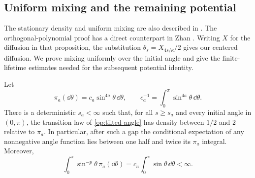 \subsection{Uniform mixing and the remaining potential}

The stationary density and uniform mixing are also described in
\cite[Section~4.2]{LawlerRezaei2015}. The orthogonal-polynomial
proof has a direct counterpart in
Zhan \cite[Proposition~4.2]{Zhan2019Optimal}. Writing $X$ for the
diffusion in that proposition, the substitution $\theta_s=X_{4s/\kappa}/2$
gives our centered diffusion. We prove mixing uniformly over the initial
angle and give the finite-lifetime estimates needed for the subsequent
potential identity.

\begin{lemma}\label{op:mixing}
Let
\begin{equation}
 \pi_a(\dd\theta)=c_a\sin^{4a}\theta\,\dd\theta,
 \qquad c_a^{-1}=\int_0^\pi\sin^{4a}\theta\,\dd\theta.
 \label{op:stationary}
\end{equation}
There is a deterministic $s_a<\infty$ such that, for all $s\ge s_a$
and every initial angle in $(0,\pi)$, the transition law of
\eqref{op:tilted-angle} has density between $1/2$ and $2$ relative to
$\pi_a$. In particular, after such a gap the conditional expectation
of any nonnegative angle function lies between one half and twice its
$\pi_a$ integral. Moreover,
\begin{equation}
 \int_0^\pi\sin^{-p}\theta\,\pi_a(\dd\theta)
 =c_a\int_0^\pi\sin\theta\,\dd\theta<\infty.
 \label{op:inverse-angle}
\end{equation}
\end{lemma}

